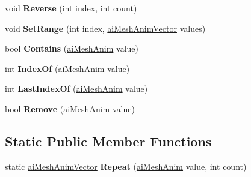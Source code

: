 \begin{DoxyCompactItemize}
\item 
\hypertarget{classai_mesh_anim_vector_a947037c4932597aef1ef7467316d1107}{void {\bfseries Reverse} (int index, int count)}\label{classai_mesh_anim_vector_a947037c4932597aef1ef7467316d1107}

\item 
\hypertarget{classai_mesh_anim_vector_a84e4f1cd5efe6c536040fb8c0f171d09}{void {\bfseries Set\+Range} (int index, \hyperlink{classai_mesh_anim_vector}{ai\+Mesh\+Anim\+Vector} values)}\label{classai_mesh_anim_vector_a84e4f1cd5efe6c536040fb8c0f171d09}

\item 
\hypertarget{classai_mesh_anim_vector_a213f16a1ec8e3e88f0f37d17fc554c35}{bool {\bfseries Contains} (\hyperlink{structai_mesh_anim}{ai\+Mesh\+Anim} value)}\label{classai_mesh_anim_vector_a213f16a1ec8e3e88f0f37d17fc554c35}

\item 
\hypertarget{classai_mesh_anim_vector_a534e3255be774f59dc0481879af8c5f4}{int {\bfseries Index\+Of} (\hyperlink{structai_mesh_anim}{ai\+Mesh\+Anim} value)}\label{classai_mesh_anim_vector_a534e3255be774f59dc0481879af8c5f4}

\item 
\hypertarget{classai_mesh_anim_vector_a47084bd901d59ef7b06a598b0d58ba59}{int {\bfseries Last\+Index\+Of} (\hyperlink{structai_mesh_anim}{ai\+Mesh\+Anim} value)}\label{classai_mesh_anim_vector_a47084bd901d59ef7b06a598b0d58ba59}

\item 
\hypertarget{classai_mesh_anim_vector_a948e5c7c6e25a14fb8e181cf359ecf3b}{bool {\bfseries Remove} (\hyperlink{structai_mesh_anim}{ai\+Mesh\+Anim} value)}\label{classai_mesh_anim_vector_a948e5c7c6e25a14fb8e181cf359ecf3b}

\end{DoxyCompactItemize}
\subsection*{Static Public Member Functions}
\begin{DoxyCompactItemize}
\item 
\hypertarget{classai_mesh_anim_vector_aa1b69fedb2ad55302ef7188c2211dc3d}{static \hyperlink{classai_mesh_anim_vector}{ai\+Mesh\+Anim\+Vector} {\bfseries Repeat} (\hyperlink{structai_mesh_anim}{ai\+Mesh\+Anim} value, int count)}\label{classai_mesh_anim_vector_aa1b69fedb2ad55302ef7188c2211dc3d}

\end{DoxyCompactItemize}
